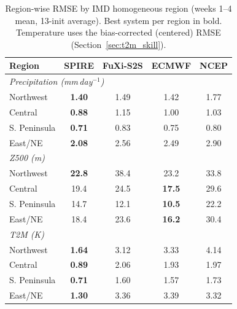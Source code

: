 \begin{table}[t]\centering
\caption{Region-wise RMSE by IMD homogeneous region (weeks 1--4 mean, 13-init average). Best system per region in bold. Temperature uses the bias-corrected (centered) RMSE (Section~\ref{sec:t2m_skill}).}\label{tab:reg_rmse}
\begin{tabular}{lcccc}\toprule
Region & SPIRE & FuXi-S2S & ECMWF & NCEP \\
\midrule
\multicolumn{5}{l}{\emph{Precipitation (mm\,day$^{-1}$)}}\\
Northwest     & \textbf{1.40} & 1.49 & 1.42 & 1.77 \\
Central       & \textbf{0.88} & 1.15 & 1.00 & 1.03 \\
S. Peninsula  & \textbf{0.71} & 0.83 & 0.75 & 0.80 \\
East/NE       & \textbf{2.08} & 2.56 & 2.49 & 2.90 \\
\midrule
\multicolumn{5}{l}{\emph{Z500 (m)}}\\
Northwest     & \textbf{22.8} & 38.4 & 23.2 & 33.8 \\
Central       & 19.4 & 24.5 & \textbf{17.5} & 29.6 \\
S. Peninsula  & 14.7 & 12.1 & \textbf{10.5} & 22.2 \\
East/NE       & 18.4 & 23.6 & \textbf{16.2} & 30.4 \\
\midrule
\multicolumn{5}{l}{\emph{T2M (K)}}\\
Northwest     & \textbf{1.64} & 3.12 & 3.33 & 4.14 \\
Central       & \textbf{0.89} & 2.06 & 1.93 & 1.97 \\
S. Peninsula  & \textbf{0.71} & 1.60 & 1.57 & 1.73 \\
East/NE       & \textbf{1.30} & 3.36 & 3.39 & 3.32 \\
\bottomrule\end{tabular}\end{table}

